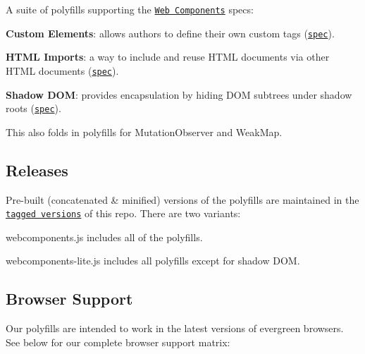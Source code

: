 \href{https://travis-ci.org/webcomponents/webcomponentsjs}{\tt }

A suite of polyfills supporting the \href{http://webcomponents.org}{\tt Web Components} specs\+:

{\bfseries Custom Elements}\+: allows authors to define their own custom tags (\href{https://w3c.github.io/webcomponents/spec/custom/}{\tt spec}).

{\bfseries H\+T\+ML Imports}\+: a way to include and reuse H\+T\+ML documents via other H\+T\+ML documents (\href{https://w3c.github.io/webcomponents/spec/imports/}{\tt spec}).

{\bfseries Shadow D\+OM}\+: provides encapsulation by hiding D\+OM subtrees under shadow roots (\href{https://w3c.github.io/webcomponents/spec/shadow/}{\tt spec}).

This also folds in polyfills for {\ttfamily Mutation\+Observer} and {\ttfamily Weak\+Map}.

\subsection*{Releases}

Pre-\/built (concatenated \& minified) versions of the polyfills are maintained in the \href{https://github.com/webcomponents/webcomponentsjs/releases}{\tt tagged versions} of this repo. There are two variants\+:

{\ttfamily webcomponents.\+js} includes all of the polyfills.

{\ttfamily webcomponents-\/lite.\+js} includes all polyfills except for shadow D\+OM.

\subsection*{Browser Support}

Our polyfills are intended to work in the latest versions of evergreen browsers. See below for our complete browser support matrix\+:

